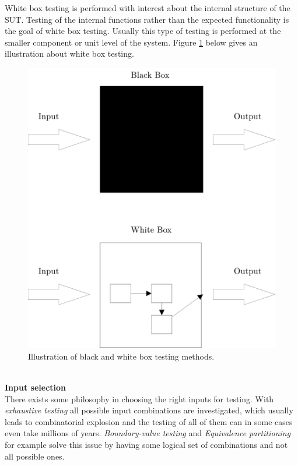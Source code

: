 \documentclass[english,12pt,a4paper,pdftex,elec,utf8]{aaltothesis}
\begin{document}
White box testing is performed with interest about the internal structure of the SUT. Testing of the internal functions rather than the expected functionality is the goal of white box testing. Usually this type of testing is performed at the smaller component or unit level of the system. Figure \ref{boxfigurespuge} below gives an illustration about white box testing. \cite{artofsofttesting}\\
\begin{figure}[h!]
\centering
\includegraphics[scale=0.4]{whiteblackbox}
\caption{Illustration of black and white box testing methods. \cite{artofsofttesting}}
\label{boxfigurespuge}
\end{figure} 
\\
\textbf{Input selection}\\
There exists some philosophy in choosing the right inputs for testing. With \textit{exhaustive testing} all possible input combinations are investigated, which usually leads to combinatorial explosion and the testing of all of them can in some cases even take millions of years. \textit{Boundary-value testing} and \textit{Equivalence partitioning} for example solve this issue by having some logical set of combinations and not all possible ones. \cite{artofsofttesting}\par 
\end{document}
